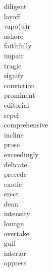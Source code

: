 \documentclass[a4paper, 11pt]{ctexart}
\begin{document}
\begin{multicols*}{3}
\begin{description}
\item[diligent]

\item[layoff]

\item[vapo(u)r]

\item[ashore]

\item[faithfully]

\item[impair]

\item[tragic]

\item[signify]

\item[conviction]

\item[prominent]

\item[editorial]

\item[repel]

\item[comprehensive]

\item[incline]

\item[prose]

\item[exceedingly]

\item[delicate]

\item[precede]

\item[exotic]

\item[erect]

\item[dean]

\item[intensity]

\item[lounge]

\item[overtake]

\item[gulf]

\item[interior]

\item[oppress]


\end{description}
\end{multicols*}
\end{document}
